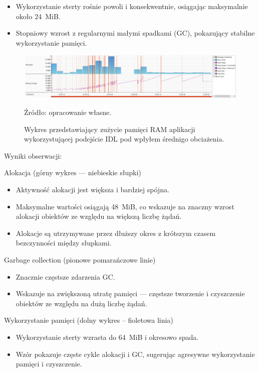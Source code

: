 \documentclass[runningheads,12pt]{llncs}
\begin{document}
\begin{itemize}
  \item Wykorzystanie sterty rośnie powoli i konsekwentnie, osiągając maksymalnie około 24~MiB.
  \item Stopniowy wzrost z regularnymi małymi spadkami (GC), pokazujący stabilne wykorzystanie pamięci.
\end{itemize}

\newpage

\begin{figure}
    \includegraphics[width=\linewidth]{images/idl-memory-low-graph.jpg}
    \caption{Wykres przedstawiający zużycie pamięci RAM aplikacji wykorzystującej podejście IDL pod wpłyłem średnigo obciażenia.} \label{fig1}
    \vspace{0.5em}
    {\small Źródło: opracowanie własne.}
\end{figure}

Wyniki obserwacji:

Alokacja (górny wykres — niebieskie słupki)

\begin{itemize}
  \item Aktywność alokacji jest większa i bardziej spójna.
  \item Maksymalne wartości osiągają 48~MiB, co wskazuje na znaczny wzrost alokacji obiektów ze względu na większą liczbę żądań.
  \item Alokacje są utrzymywane przez dłuższy okres z krótszym czasem bezczynności między słupkami.
\end{itemize}

Garbage collection (pionowe pomarańczowe linie)

\begin{itemize}
  \item Znacznie częstsze zdarzenia GC.
  \item Wskazuje na zwiększoną utratę pamięci — częstsze tworzenie i czyszczenie obiektów ze względu na dużą liczbę żądań.
\end{itemize}

Wykorzystanie pamięci (dolny wykres – fioletowa linia)

\begin{itemize}
  \item Wykorzystanie sterty wzrasta do 64~MiB i okresowo spada.
  \item Wzór pokazuje częste cykle alokacji i GC, sugerując agresywne wykorzystanie pamięci i czyszczenie.
\end{itemize}
\end{document}
